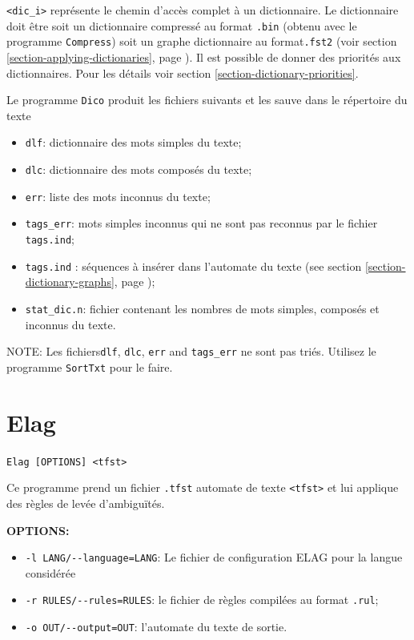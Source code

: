 \bigskip
\noindent \verb+<dic_i>+ représente le chemin d’accès complet à un dictionnaire. Le dictionnaire
doit être soit un dictionnaire compressé au format \verb+.bin+ (obtenu avec le programme
	\verb+Compress+) soit un graphe dictionnaire au format\verb+.fst2+ (voir section
\ref{section-applying-dictionaries}, page \pageref{section-applying-dictionaries}).
	 Il est possible de donner des priorités aux dictionnaires. Pour
	les détails voir section \ref{section-dictionary-priorities}.

\bigskip
\noindent Le programme \verb+Dico+ produit les fichiers suivants et les sauve dans le répertoire du
texte

\begin{itemize}
  \item \verb+dlf+: dictionnaire des mots simples du texte;
  \item \verb+dlc+: dictionnaire des mots composés du texte;
  \item \verb+err+: liste des mots inconnus du texte;
  \item \verb+tags_err+: mots simples inconnus qui ne sont pas reconnus par le fichier
  	  \verb+tags.ind+;
  \item \verb+tags.ind+ : séquences à insérer dans l'automate du texte
  (see section \ref{section-dictionary-graphs}, page \pageref{section-dictionary-graphs});
  \item \verb+stat_dic.n+: fichier contenant les nombres de mots simples, composés et inconnus du
  	  texte.
\end{itemize}

\bigskip
\noindent NOTE: Les fichiers\verb+dlf+, \verb+dlc+, \verb+err+ and \verb+tags_err+ ne sont pas triés. Utilisez le programme \verb+SortTxt+ pour le faire.



\section{Elag}
\verb+Elag [OPTIONS] <tfst>+

\bigskip
\noindent Ce programme prend un fichier \verb+.tfst+ automate de texte \verb+<tfst>+ et lui applique
des règles de levée d’ambiguïtés. 

\bigskip
\noindent \textbf{OPTIONS:}
\begin{itemize}
\item \verb+-l LANG/--language=LANG+: Le fichier de configuration ELAG pour la langue considérée
  \item \verb+-r RULES/--rules=RULES+: le fichier de règles compilées au format \verb+.rul+;
  \item \verb+-o OUT/--output=OUT+: l’automate du texte de sortie.
\end{itemize}







